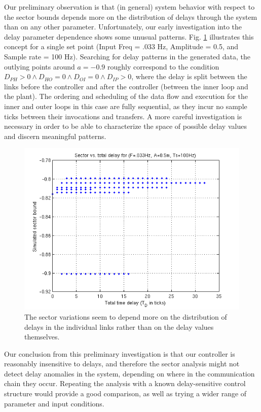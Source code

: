 Our preliminary observation is that (in general) system behavior with respect to the sector
bounds depends more on the distribution of delays through the system than on any other 
parameter.  Unfortunately, our early investigation into the delay parameter dependence 
shows some unusual patterns.   Fig. \ref{fig:delaydata} illustrates
this concept for a single set point (Input Freq = .033 Hz, Amplitude = 0.5, and Sample rate
= 100 Hz).  Searching for delay patterns in the generated data, the outlying points around 
$a = -0.9$ roughly correspond to the condition
$D_{PH} > 0 \wedge D_{HO} = 0 \wedge D_{OI} = 0 \wedge D_{IP} > 0$, 
where the delay is split between the links before the controller and after the controller
(between the inner loop and the plant). The ordering and scheduling of the data flow and execution
for the inner and outer loops in this case are fully sequential, as they incur no sample ticks
between their invocations and transfers. A more careful investigation is necessary in order to be 
able to characterize the space of possible delay values and discern meaningful patterns.

\begin{figure}[htb]
\centering
\includegraphics[width=\columnwidth]{figures/sectvstotaldelay}
    \caption{The sector variations seem to depend more on the distribution of delays in the 
individual links rather than on the delay values themselves.}
    \label{fig:delaydata}
\end{figure}

Our conclusion from this preliminary investigation is that our controller is reasonably
insensitive to delays, and therefore the sector analysis might not detect delay anomalies in
the system, depending on where in the communication chain they occur.  Repeating the analysis
with a known delay-sensitive control structure would provide a good comparison, as well as trying
a wider range of parameter and input conditions.
